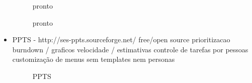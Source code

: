 \begin{itemize}
\begin{figure}[htbp]
  \centering
  \caption{pronto}
\end{figure}

\begin{figure}[htbp]
  \centering
  \caption{pronto}
\end{figure}

\item PPTS - http://ses-ppts.sourceforge.net/
free/open source
prioritizacao
burndown / graficos
velocidade / estimativas
controle de tarefas por pessoas
customização de menus
sem templates nem personas

\begin{figure}[htbp]
  \centering
  \caption{PPTS}
\end{figure}


\end{itemize}
